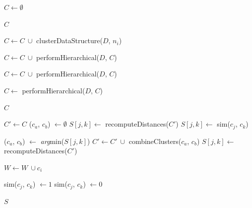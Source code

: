\documentclass[12pt]{ucthesis}
\begin{document}
         \begin{algorithmic}
               \State $C \gets \emptyset$

                  \Return $C$
               \EndIf

                     \State $C \gets C\ \cup$ clusterDataStructure($D$, $n_i$)

                        \State $C \gets C\ \cup$ performHierarchical($D$, $C$)
                     \EndIf
                  \EndFor

                     \State $C \gets C\ \cup$ performHierarchical($D$, $C$)
                  \EndIf

               \Else
                  \State $C \gets$ performHierarchical($D$, $C$)
               \EndIf

               \Return $C$
            \EndFunction

               \State $C' \gets C$
               \State ($c_a$, $c_b$) $\gets \emptyset$
               \State $S[j,k] \gets$ recomputeDistances($C'$)
                  $S[j, k] \gets$ sim($c_j$, $c_k$)
               \EndFor

                  \State ($c_a$, $c_b$) $\gets$ \textit{arg}min($S[j,k]$)
                     \State $C' \gets C'\ \cup$ combineClusters($c_a$, $c_b$)
                     \State $S[j,k] \gets$ recomputeDistances($C'$)
                  \EndIf
               \EndWhile

                     \State $W \gets W\ \cup c_i$
                  \EndIf
               \EndFor
            \EndFunction

                     \State sim($c_j$, $c_k$) $\gets 1$
                     \State sim($c_j$, $c_k$) $\gets 0$
                  \EndIf
               \EndFor

               \Return $S$
            \EndFunction
         \end{algorithmic}
\end{document}
